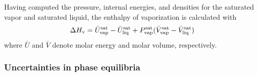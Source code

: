 \documentclass[journal=jced,manuscript=article]{achemso}
\begin{document}

Having computed the pressure, internal energies, and densities for the saturated vapor and saturated liquid, the enthalpy of vaporization is calculated with
\begin{equation}
\Delta H_{\rm v} = \bar U_{\rm vap}^{\rm sat} - \bar U_{\rm liq}^{\rm sat} + P_{\rm vap}^{\rm sat} (\bar V_{\rm vap}^{\rm sat} - \bar V_{\rm liq}^{\rm sat})
\end{equation}
where $\bar U$ and $\bar V$ denote molar energy and molar volume, respectively.

\subsubsection{Uncertainties in phase equilibria} \label{sec: Uncertainties}
\end{document}
